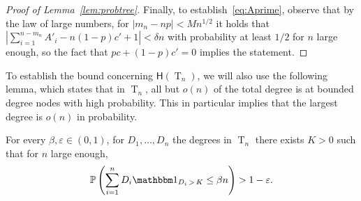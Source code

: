 \documentclass[AHL,Unicode,longabstracts,published]{cedram}
\renewcommand{\P}{\mathbb{P}}
\newcommand{\height}{\mathsf{H}}
\DeclareMathOperator{\rtree}{T}
\newcommand{\I}[1]{{\mathbbm 1}_{#1}}
\begin{document}
\begin{proof}[Proof of Lemma~\ref{lem:probtree}]
Finally, to establish~\eqref{eq:Aprime}, observe that by the law of large numbers, for $|m_n-np|<Mn^{1/2}$ it holds that $|\sum_{i=1}^{n-m_n}A'_i-n(1-p)c'+1|<\delta n$ with probability at least $1/2$ for $n$ large enough, so the fact that $pc+(1-p)c'=0$ implies the statement.
\end{proof}

To establish the bound concerning $\height(\rtree_{n})$, we will also use the following lemma, which states that in $\rtree_n$, all but $o(n)$ of the total degree is at bounded degree nodes with high probability. This in particular implies that the largest degree is $o(n)$ in probability.

\begin{lemm}\label{lem:nomasshighdegrees}
For every $\beta,\varepsilon \in (0,1)$, for $D_1,\dots, D_n$ the degrees in $\rtree_n$ there exists $K>0$ such that for $n$ large enough,
\[
\P\left(\sum_{i=1}^n D_i\I{D_i\,>\,K}\leq \beta n \right)>1-\varepsilon.
\]
\end{lemm}
\end{document}
